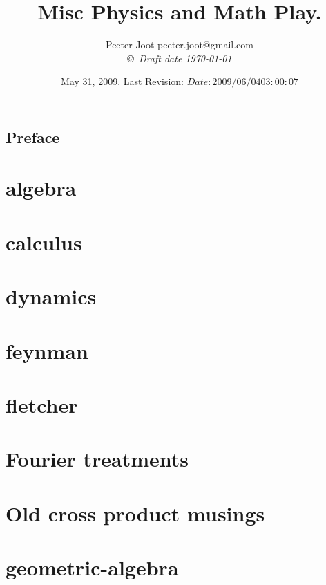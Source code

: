 \documentclass[12pt,leqno]{book}
\title{Misc Physics and Math Play.}
\author{Peeter Joot  \quad peeter.joot@gmail.com \\
{\small\em \copyright \  Draft date \today }}
\date{ May 31, 2009.  Last Revision: $Date: 2009/06/04 03:00:07 $ }
\begin{document}
\maketitle
\tableofcontents
\listoffigures
\listoftables
\chapter*{Preface}\normalsize
\pagestyle{plain}

%
\pagestyle{headings}


\part{algebra}



\part{calculus}




\part{dynamics}


\part{feynman}


\part{fletcher}


\part{Fourier treatments}


\part{Old cross product musings}



\part{geometric-algebra}







\end{document}
